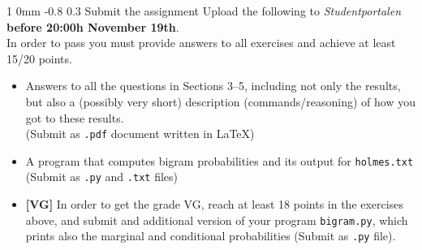 \documentclass[11pt]{article}
\makeatletter
\newcommand{\newsec}[2]{\section{#1}\label{sec:#2}\noindent}
\renewcommand{\section}{\@startsection
{section}%
{1}%
{0mm}%
{-0.8\baselineskip}%
{0.3\baselineskip}%
{\bfseries\large}}%
\makeatother
\begin{document}
\newsec{Submit the assignment}{submit}%
Upload the following to {\it Studentportalen} {\bf before 20:00h
  November 19th}.\\In order to pass you must provide answers to all
exercises and achieve at least 15/20 points.
\begin{itemize}[noitemsep,topsep=0.2cm]
\item Answers to all the questions in Sections 3--5, including not
  only the results, but also a (possibly very short) description
  (commands/reasoning) of how you got to these
  results.\\ %
  (Submit as \texttt{.pdf} document written in \LaTeX)
\item A program that computes bigram probabilities and its output for {\tt holmes.txt}\\
  (Submit as \texttt{.py} and \texttt{.txt} files)
\item \textbf{[VG]} In order to get the grade VG, reach at least 18
  points in the exercises above, and submit and additional version of
  your program {\tt bigram.py}, which prints also the marginal and
  conditional probabilities (Submit as \texttt{.py} file).
\end{itemize}
\end{document}
